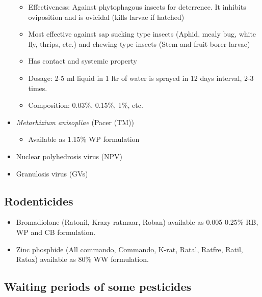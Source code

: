 \documentclass[
  openany]{book}
\providecommand{\tightlist}{%
  \setlength{\itemsep}{0pt}\setlength{\parskip}{0pt}}
\begin{document}
\begin{itemize}
  \begin{itemize}
  \tightlist
  \item
    Effectiveness: Against phytophagous insects for deterrence. It inhibits oviposition and is ovicidal (kills larvae if hatched)
  \item
    Most effective against sap sucking type insects (Aphid, mealy bug, white fly, thrips, etc.) and chewing type insects (Stem and fruit borer larvae)
  \item
    Has contact and systemic property
  \item
    Dosage: 2-5 ml liquid in 1 ltr of water is sprayed in 12 days interval, 2-3 times.
  \item
    Composition: 0.03\%, 0.15\%, 1\%, etc.
  \end{itemize}
\item
  \emph{Metarhizium anisopliae} (Pacer (TM))

  \begin{itemize}
  \tightlist
  \item
    Available as 1.15\% WP formulation
  \end{itemize}
\item
  Nuclear polyhedrosis virus (NPV)
\item
  Granulosis virus (GVs)
\end{itemize}

\hypertarget{rodenticides}{%
\subsection{Rodenticides}\label{rodenticides}}

\begin{itemize}
\tightlist
\item
  Bromadiolone (Ratonil, Krazy ratmaar, Roban) available as 0.005-0.25\% RB, WP and CB formulation.
\item
  Zinc phosphide (All commando, Commando, K-rat, Ratal, Ratfre, Ratil, Ratox) available as 80\% WW formulation.
\end{itemize}

\hypertarget{waiting-periods-of-some-pesticides}{%
\subsection{Waiting periods of some pesticides}\label{waiting-periods-of-some-pesticides}}
\end{document}
